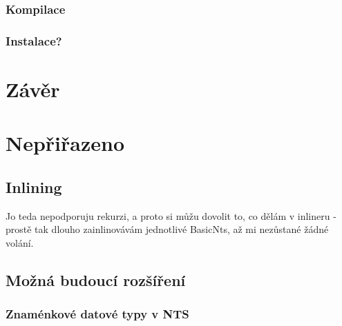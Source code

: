 \documentclass[10pt,a4paper,notitlepage]{report}
\begin{document}
\subsection{Kompilace}
\subsection{Instalace?}

\chapter{Závěr}



\chapter{Nepřiřazeno}
\section{Inlining}
Jo teda nepodporuju rekurzi, a proto si můžu dovolit to, co dělám v inlineru - prostě tak dlouho zainlinovávám jednotlivé BasicNts, až mi nezůstané žádné volání.

\section{Možná budoucí rozšíření}

\subsection{Znaménkové datové typy v NTS}


\tableofcontents

\printbibliography
\end{document}
